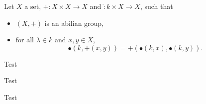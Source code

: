 \newlecture

\begin{defn}
Let $X$ a set, $+: X\times X \to X$ and $\dot : k \times X \to X$, such that 
\begin{itemize}
\item
$(X,+)$ is an abilian group,
\item 
for all $\lambda \in k$ and $x,y\in X$,
\[ \bullet( k, +(x, y) ) = +( \bullet(k,x), \bullet(k,y)). \]
\end{itemize}
\end{defn}

\begin{exmp}
Test
\end{exmp}

\begin{them}
Test
\end{them}

\begin{remark}
Test
\end{remark}
